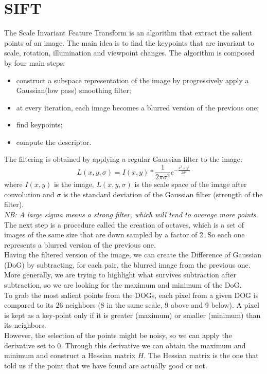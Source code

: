 \section{SIFT}
The Scale Invariant Feature Transform is an algorithm that extract the salient points of an image.
The main idea is to find the keypoints that are invariant to scale, rotation, illumination and viewpoint changes.
The algorithm is composed by four main steps:
\begin{itemize}
    \item construct a subspace representation of the image by progressively apply a Gaussian(low pass) smoothing filter;
    \item at every iteration, each image becomes a blurred version of the previous one;
    \item find keypoints;
    \item compute the descriptor.
\end{itemize}
The filtering is obtained by applying a regular Gaussian filter to the image:
\[
    L(x,y,\sigma) = I(x,y) * \frac{1}{2\pi\sigma^2}e^{-\frac{x^2+y^2}{2\sigma^2}}
\]
where $I(x,y)$ is the image, $L(x,y,\sigma)$ is the scale space of the image after convolution and $\sigma$ is the standard deviation of the Gaussian filter (strength of the filter).
\\\textit{NB: A large sigma means a strong filter, which will tend to average more points.}
\\
The next step is a procedure called the creation of octaves, which is a set of images of the same size that are down sampled by a factor of 2.
So each one represents a blurred version of the previous one.
\\Having the filtered version of the image, we can create the Difference of Gaussian (DoG) by subtracting, for each pair, the blurred image from the previous one.
More generally, we are trying to highlight what survives subtraction after subtraction, so we are looking for the maximum and minimum of the DoG.
\\To grab the most salient points from the DOGs, each pixel from a given DOG is compared to its 26 neighbors (8 in the same scale, 9 above and 9 below).
A pixel is kept as a key-point only if it is greater (maximum) or smaller (minimum) than its neighbors.
\\However, the selection of the points might be noisy, so we can apply the derivative set to $0$. 
Through this derivative we can obtain the maximum and minimum and construct a Hessian matrix $H$.
The Hessian matrix is the one that told us if the point that we have found are actually good or not.
